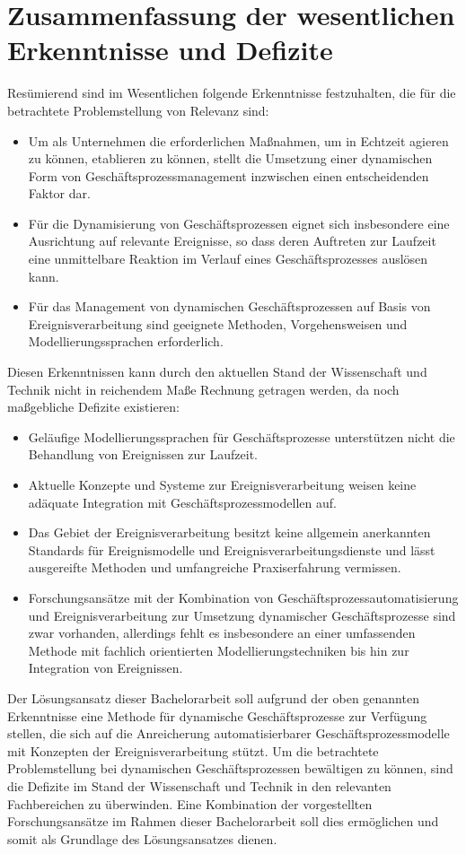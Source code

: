 \section{Zusammenfassung der wesentlichen Erkenntnisse und Defizite}\label{sec:grundlagensummary}

Resümierend sind im Wesentlichen folgende Erkenntnisse festzuhalten, die für die betrachtete Problemstellung von Relevanz sind:
\begin{itemize}
	\item 
	Um als Unternehmen die erforderlichen Maßnahmen, um in Echtzeit agieren zu können, etablieren zu können, stellt die Umsetzung einer dynamischen Form von Geschäftsprozessmanagement inzwischen einen entscheidenden Faktor dar.
    \item 
    Für die Dynamisierung von Geschäftsprozessen eignet sich insbesondere eine Ausrichtung auf relevante Ereignisse, so dass deren Auftreten zur Laufzeit eine unmittelbare Reaktion im Verlauf eines Geschäftsprozesses auslösen kann.
    \item
    Für das Management von dynamischen Geschäftsprozessen auf Basis von Ereignisverarbeitung sind geeignete Methoden, Vorgehensweisen und Modellierungssprachen erforderlich.
\end{itemize}

Diesen Erkenntnissen kann durch den aktuellen Stand der Wissenschaft und Technik nicht in
reichendem Maße Rechnung getragen werden, da noch maßgebliche Defizite existieren:
\begin{itemize}
	\item
	Geläufige Modellierungssprachen für Geschäftsprozesse unterstützen nicht die Behandlung von Ereignissen zur Laufzeit.
    \item 
    Aktuelle Konzepte und Systeme zur Ereignisverarbeitung weisen keine adäquate Integration mit Geschäftsprozessmodellen auf.
    \item
    Das Gebiet der Ereignisverarbeitung besitzt keine allgemein anerkannten Standards für Ereignismodelle und Ereignisverarbeitungsdienste und lässt ausgereifte Methoden und umfangreiche Praxiserfahrung vermissen.
    \item
    Forschungsansätze mit der Kombination von Geschäftsprozessautomatisierung und Ereignisverarbeitung zur Umsetzung dynamischer Geschäftsprozesse sind zwar vorhanden, allerdings fehlt es insbesondere an einer umfassenden Methode mit fachlich orientierten Modellierungstechniken bis hin zur Integration von Ereignissen.
\end{itemize}

Der Lösungsansatz dieser Bachelorarbeit soll aufgrund der oben genannten Erkenntnisse eine Methode für dynamische Geschäftsprozesse zur Verfügung stellen, die sich auf die Anreicherung automatisierbarer Geschäftsprozessmodelle mit Konzepten der Ereignisverarbeitung stützt. 
Um die betrachtete Problemstellung bei dynamischen Geschäftsprozessen bewältigen zu können, sind die Defizite im Stand der Wissenschaft und Technik in den relevanten Fachbereichen zu überwinden. Eine Kombination der vorgestellten Forschungsansätze im Rahmen dieser Bachelorarbeit soll dies ermöglichen und somit als Grundlage des Lösungsansatzes dienen.